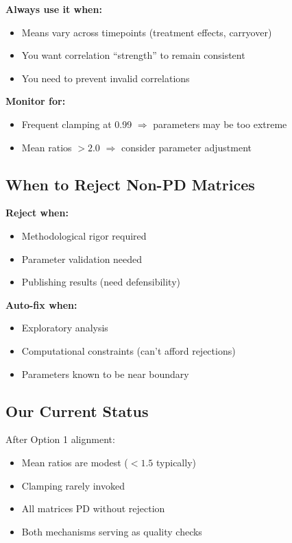 \documentclass[11pt]{article}
\begin{document}
\textbf{Always use it when:}
\begin{itemize}
    \item Means vary across timepoints (treatment effects, carryover)
    \item You want correlation ``strength'' to remain consistent
    \item You need to prevent invalid correlations
\end{itemize}

\textbf{Monitor for:}
\begin{itemize}
    \item Frequent clamping at 0.99 $\Rightarrow$ parameters may be too extreme
    \item Mean ratios $> 2.0$ $\Rightarrow$ consider parameter adjustment
\end{itemize}

\subsection{When to Reject Non-PD Matrices}

\textbf{Reject when:}
\begin{itemize}
    \item Methodological rigor required
    \item Parameter validation needed
    \item Publishing results (need defensibility)
\end{itemize}

\textbf{Auto-fix when:}
\begin{itemize}
    \item Exploratory analysis
    \item Computational constraints (can't afford rejections)
    \item Parameters known to be near boundary
\end{itemize}

\subsection{Our Current Status}

After Option 1 alignment:
\begin{itemize}
    \item[\checkmark] Mean ratios are modest ($< 1.5$ typically)
    \item[\checkmark] Clamping rarely invoked
    \item[\checkmark] All matrices PD without rejection
    \item[\checkmark] Both mechanisms serving as quality checks
\end{itemize}
\end{document}
